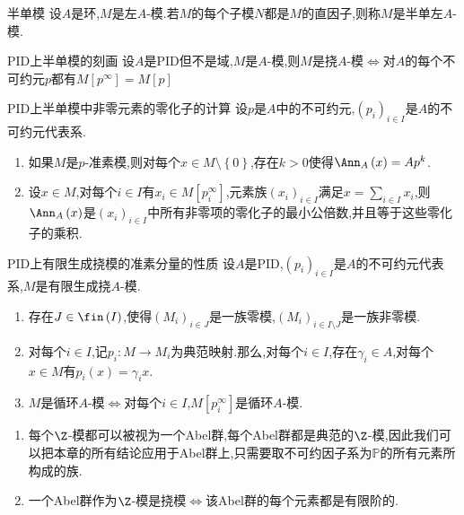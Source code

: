 \begin{definition}{半单模}{}
	设$A$是环,$M$是左$A$-模.若$M$的每个子模$N$都是$M$的直因子,则称$M$是半单左$A$-模.
\end{definition}

\begin{corollary}{PID上半单模的刻画}{}
	设$A$是PID但不是域,$M$是$A$-模,则$M$是挠$A$-模$\iff$对$A$的每个不可约元$p$都有$M[p^{\infty}]=M[p]$
\end{corollary}

\begin{remark}{PID上半单模中非零元素的零化子的计算}{}
	设$p$是$A$中的不可约元,$\left(p_{i}\right)_{i\in I}$是$A$的不可约元代表系.
	\begin{enumerate}
		\item 如果$M$是$p$-准素模,则对每个$x\in M\setminus\left\{0\right\}$,存在$k>0$使得$\Ann_{A}\left(x\right)=Ap^{k}$.
		\item 设$x\in M$,对每个$i\in I$有$x_{i}\in M[p_{i}^{\infty}]$,元素族$\left(x_{i}\right)_{i\in I}$满足$x=\sum\limits_{i\in I}x_{i}$,则$\Ann_{A}\left(x\right)$是$\left(x_{i}\right)_{i\in I}$中所有非零项的零化子的最小公倍数,并且等于这些零化子的乘积.
	\end{enumerate}
\end{remark}

\begin{proposition}{PID上有限生成挠模的准素分量的性质}{}
	设$A$是PID,$\left(p_{i}\right)_{i\in I}$是$A$的不可约元代表系,$M$是有限生成挠$A$-模.
	\begin{enumerate}
		\item 存在$J\in\fin\left(I\right)$,使得$\left(M_{i}\right)_{i\in J}$是一族零模,$\left(M_{i}\right)_{i\in I\setminus J}$是一族非零模.
		\item 对每个$i\in I$,记$p_{i}:M\to M_{i}$为典范映射.那么,对每个$i\in I$,存在$\gamma_{i}\in A$,对每个$x\in M$有$p_{i}\left(x\right)=\gamma_{i}x$.
		\item $M$是循环$A$-模$\iff$对每个$i\in I$,$M[p_{i}^{\infty}]$是循环$A$-模.
	\end{enumerate}
\end{proposition}

\begin{remark}{}{}
	\begin{enumerate}
		\item 每个$\Z$-模都可以被视为一个Abel群,每个Abel群都是典范的$\Z$-模,因此我们可以把本章的所有结论应用于Abel群上,只需要取不可约因子系为$\mathbb{P}$的所有元素所构成的族.
		\item 一个Abel群作为$\Z$-模是挠模$\iff$该Abel群的每个元素都是有限阶的.
	\end{enumerate}
\end{remark}


